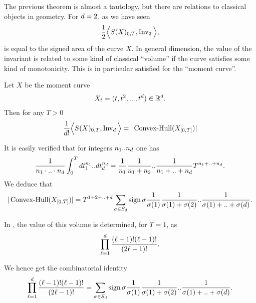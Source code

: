 The previous theorem is almost a tautology, but there are relations to classical objects in geometry.
For $d=2$, as we have seen %
\begin{align*}
  \frac{1}{2} \Big\langle S(X)_{0,T}, \operatorname{Inv}_{2} \Big\rangle,
\end{align*}
is equal to the signed area of the curve $X$.
In general dimension, the value of the invariant is related
to some kind of classical ``volume'' if the curve satisfies
some kind of monotonicity.
This is in particular satisfied for the ``moment curve''.
\begin{lemma}
  \label{lem:momentCurve}
  Let $X$ be the moment curve
  \begin{align*}
    X_t = (t,t^2,...,t^d) \in \mathbb{R}^d.
  \end{align*}
  Then for any $T > 0$
  \begin{align*}
    \frac{1}{d !} \Big\langle S(X)_{0,T}, \operatorname{Inv}_{d} \Big\rangle
    =
    |\operatorname{Convex-Hull}( X_{[0,T]} )|
  \end{align*}
\end{lemma}
\begin{remark}
  It is easily verified that for integers $n_1 .. n_d$ one has
  \begin{align*}
    \frac{1}{n_1 \cdot .. \cdot n_d}
    \int_0^T dt_1^{n_1} .. dt_d^{n_d}
    =
    \frac{1}{n_1}
    \frac{1}{n_1+n_2}
    ..
    \frac{1}{n_1+..+n_d}
    T^{n_1+..+n_d}.
  \end{align*}
  We deduce that
  \begin{align*}
    |\operatorname{Convex-Hull}( X_{[0,T]} )|
    =
    T^{1+2+..+d}
    \sum_{\sigma\in S_d} \operatorname{sign} \sigma
    \frac{1}{\sigma(1)}
    \frac{1}{\sigma(1)+\sigma(2)}
    ..
    \frac{1}{\sigma(1)+..+\sigma(d)}.
  \end{align*}

  In \cite[Section 15]{moment}, 
  the value of this volume is determined,
  for $T=1$, as
  \begin{align*}
    \prod_{\ell=1}^d \frac{(\ell-1)! (\ell-1)!}{(2\ell-1)!}.
  \end{align*}

  We hence get the combinatorial identity
  \begin{align*}
    \prod_{\ell=1}^d \frac{(\ell-1)! (\ell-1)!}{(2\ell-1)!}
    =
    \sum_{\sigma\in S_d}
    \operatorname{sign} \sigma
    \frac{1}{\sigma(1)}
    \frac{1}{\sigma(1)+\sigma(2)}
    ..
    \frac{1}{\sigma(1)+..+\sigma(d)}.
  \end{align*}
\end{remark}
